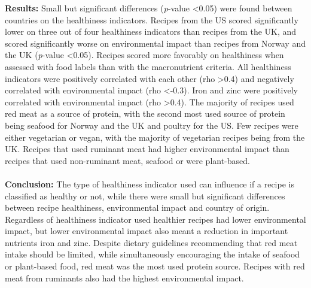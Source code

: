 \textbf{Results:} Small but significant differences (\emph{p}-value <0.05) were found between countries on the healthiness indicators. Recipes from the US scored significantly lower on three out of four healthiness indicators than recipes from the UK, and scored significantly worse on environmental impact than recipes from Norway and the UK (\emph{p}-value <0.05). Recipes scored more favorably on healthiness when assessed with food labels than with the macronutrient criteria. All healthiness indicators were positively correlated with each other (rho >0.4) and negatively correlated with environmental impact (rho <-0.3). Iron and zinc were positively correlated with environmental impact (rho >0.4). The majority of recipes used red meat as a source of protein, with the second most used source of protein being seafood for Norway and the UK and poultry for the US. Few recipes were either vegetarian or vegan, with the majority of vegetarian recipes being from the UK. Recipes that used ruminant meat had higher environmental impact than recipes that used non-ruminant meat, seafood or were plant-based.\\\\
\textbf{Conclusion:} The type of healthiness indicator used can influence if a recipe is classified as healthy or not, while there were small but significant differences between recipe healthiness, environmental impact and country of origin. Regardless of healthiness indicator used healthier recipes had lower environmental impact, but lower environmental impact also meant a reduction in important nutrients iron and zinc. Despite dietary guidelines recommending that red meat intake should be limited, while simultaneously encouraging the intake of seafood or plant-based food, red meat was the most used protein source. Recipes with red meat from ruminants also had the highest environmental impact.
\pagebreak
